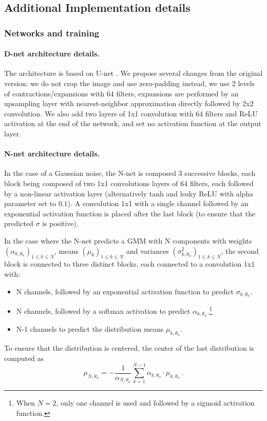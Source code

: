 \documentclass{article}
\begin{document}
\subsection{Additional Implementation details}
\label{si:implementation}
\subsubsection{Networks and training}
\paragraph{D-net architecture details.}
The architecture is based on U-net \cite{ronneberger2015u}.
We propose several changes from the original version: we do not crop the image and use zero-padding instead, we use 2 levels of contractions/expansions with 64 filters, expansions are performed by an upsampling layer with nearest-neighbor approximation directly followed by 2x2 convolution.
We also add two layers of 1x1 convolution with 64 filters and ReLU activation at the end of the network, and set no activation function at the output layer.

\paragraph{N-net architecture details.}
In the case of a Gaussian noise, the N-net is composed 3 successive blocks, each block being composed of two 1x1 convolutions layers of 64 filters, each followed by a non-linear activation layer (alternatively tanh and leaky ReLU with alpha parameter set to $0.1$). A convolution 1x1 with a single channel followed by an exponential activation function is placed after the last block (to ensure that the predicted $\sigma$ is positive).

In the case where the N-net predicts a GMM with N components with weights $(\alpha_{k,\theta_n})_{1\leqslant k\leqslant N}$, means $(\mu_k)_{1\leqslant k\leqslant N}$ and variances $(\sigma^2_{k,\theta_n})_{1\leqslant k\leqslant N}$, the second block is connected to three distinct blocks, each connected to a convolution 1x1 with:
\begin{itemize}
  \item N channels, followed by an exponential activation function to predict $\sigma_{k,\theta_n}$.
  \item N channels, followed by a softmax activation to predict $\alpha_{k,\theta_n}.$\footnote{When $N=2$, only one channel is used and followed by a sigmoid activation function.}
  \item N-1 channels to predict the distribution means $\mu_{k,\theta_n}$.
\end{itemize}
To ensure that the distribution is centered, the center of the last distribution is computed as
$$
\mu_{N,\theta_n} = - \frac{1}{\alpha_{N,\theta_n}} \sum_{k=1}^{N-1}\alpha_{k,\theta_n}\cdot\mu_{k,\theta_n}\,.
$$
\end{document}
